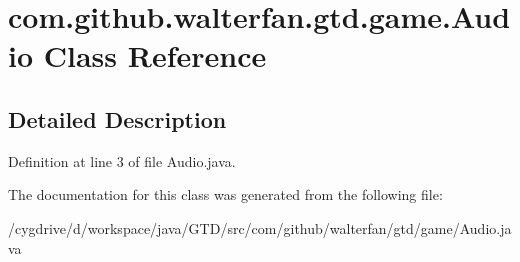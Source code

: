 \hypertarget{classcom_1_1github_1_1walterfan_1_1gtd_1_1game_1_1Audio}{\section{com.\-github.\-walterfan.\-gtd.\-game.\-Audio Class Reference}
\label{classcom_1_1github_1_1walterfan_1_1gtd_1_1game_1_1Audio}
}


\subsection{Detailed Description}


Definition at line 3 of file Audio.\-java.



The documentation for this class was generated from the following file\-:\begin{DoxyCompactItemize}
\item 
/cygdrive/d/workspace/java/\-G\-T\-D/src/com/github/walterfan/gtd/game/Audio.\-java\end{DoxyCompactItemize}
